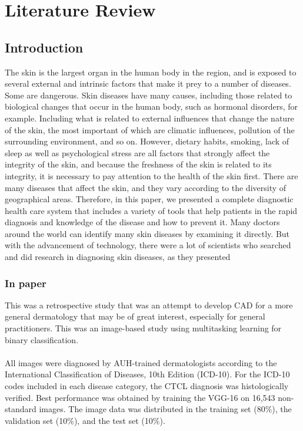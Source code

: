 \chapter{ Literature Review }
\section{Introduction}
The skin is the largest organ in the human body in the region, and is exposed to several external and intrinsic factors that make it prey to a number of diseases. Some are dangerous. Skin diseases have many causes, including those related to biological changes that occur in the human body, such as hormonal disorders, for example. Including what is related to external influences that change the nature of the skin, the most important of which are climatic influences, pollution of the surrounding environment, and so on. However, dietary habits, smoking, lack of sleep as well as psychological stress are all factors that strongly affect the integrity of the skin, and because the freshness of the skin is related to its integrity, it is necessary to pay attention to the health of the skin first. There are many diseases that affect the skin, and they vary according to the diversity of geographical areas. Therefore, in this paper, we presented a complete diagnostic health care system that includes a variety of tools that help patients in the rapid diagnosis and knowledge of the disease and how to prevent it.
Many doctors around the world can identify many skin diseases by examining it directly. But with the advancement of technology, there were a lot of scientists who searched and did research in diagnosing skin diseases, as they presented 
\subsection{In paper\cite{r1}} This was a retrospective study that was an attempt to develop CAD for a more general dermatology that may be of great interest, especially for general practitioners. This was an image-based study using multitasking learning for binary classification.\\\\
All images were diagnosed by AUH-trained dermatologists according to the International Classification of Diseases, 10th Edition (ICD-10).
For the ICD-10 codes included in each disease category, the CTCL diagnosis was histologically verified. 
Best performance was obtained by training the VGG-16 on 16,543 non-standard images. The image data was distributed in the training set (80\%), the validation set (10\%), and the test set (10\%).\\\\

